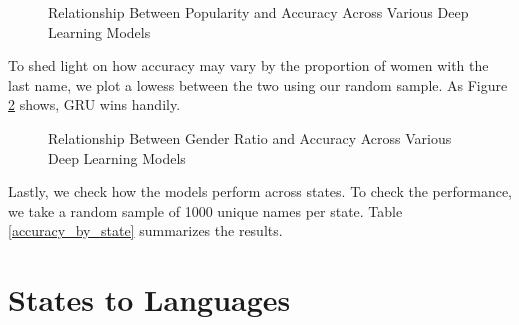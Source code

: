 \documentclass[11pt,  letterpaper]{article}
\begin{document}
\begin{figure}[!htb]

  \centering

    \caption{Relationship Between Popularity and Accuracy Across Various Deep Learning Models}


  \label{fig:popularity_accuracy}

\end{figure}

To shed light on how accuracy may vary by the proportion of women with the last name, we plot a lowess between the two using our random sample. As Figure \ref{fig:women_accuracy} shows, GRU wins handily. 

\begin{figure}[!htb]

  \centering

    \caption{Relationship Between Gender Ratio and Accuracy Across Various Deep Learning Models}


  \label{fig:women_accuracy}

\end{figure}

Lastly, we check how the models perform across states. To check the performance, we take a random sample of 1000 unique names per state. Table \ref{accuracy_by_state} summarizes the results. 



 

\section{States to Languages}
\end{document}
